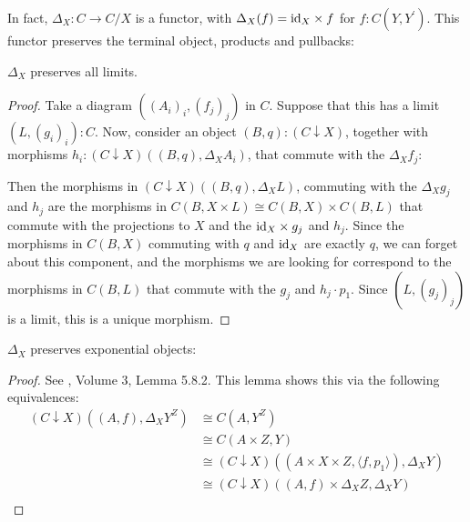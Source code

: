 In fact, $ \Delta_X : C \to C / X $ is a functor, with $ \Delta_X(f) = \text{id}_{X} \times f $ for $ f: C(Y, Y^\prime) $. This functor preserves the terminal object, products and pullbacks:
\begin{lemma}\label{lem:delta-limits}
  $ \Delta_X $ preserves all limits.
\end{lemma}
\begin{proof}
  Take a diagram $ ((A_i)_i, (f_j)_j) $ in $ C $. Suppose that this has a limit $ (L, (g_i)_i) : C $. Now, consider an object $ (B, q) : (C \downarrow X) $, together with morphisms $ h_i : (C \downarrow X)((B, q), \Delta_X A_i) $, that commute with the $ \Delta_X f_j $:
  \begin{center}
  \end{center}
  Then the morphisms in $ (C \downarrow X)((B, q), \Delta_X L) $, commuting with the $ \Delta_X g_j $ and $ h_j $ are the morphisms in $ C(B, X \times L) \cong C(B, X) \times C(B, L) $ that commute with the projections to $ X $ and the $ \text{id}_{X} \times g_j $ and $ h_j $. Since the morphisms in $ C(B, X) $ commuting with $ q $ and $ \text{id}_{X} $ are exactly $ q $, we can forget about this component, and the morphisms we are looking for correspond to the morphisms in $ C(B, L) $ that commute with the $ g_j $ and $ h_j \cdot p_1 $. Since $ (L, (g_j)_j) $ is a limit, this is a unique morphism.
\end{proof}

\begin{lemma}\label{lem:delta-exponentials}
  $ \Delta_X $ preserves exponential objects:
\end{lemma}
\begin{proof}
  See \autocite{borceux}, Volume 3, Lemma 5.8.2. This lemma shows this via the following equivalences:
  \begin{align*}
    (C \downarrow X)((A, f), \Delta_X Y^Z) &\cong C(A, Y^Z)\\
    &\cong C(A \times Z, Y)\\
    &\cong (C \downarrow X)((A \times X \times Z, \langle f, p_1 \rangle), \Delta_X Y)\\
    &\cong (C \downarrow X)((A, f) \times \Delta_X Z, \Delta_X Y)\\
  \end{align*}
\end{proof}

